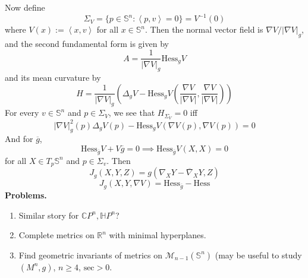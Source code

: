 \bigskip
Now define
$$
\Sigma_V=\{p\in\mathbb{S}^n:\left<p,v\right>=0\}=V^{-1}(0)
$$
where $V(x):=\left<x,v\right>$ for all $x\in\mathbb{S}^n$. Then the normal
vector field is $\nabla V/|\nabla V|_g$, and the second fundamental form is
given by
$$
A=\frac{1}{|\nabla V|_g}\text{Hess}_gV
$$
and its mean curvature by
\begin{equation}
\label{equation-mean-curvature-for-level-sets-V}
H=\frac{1}{|\nabla V|_g}\left(\Delta_gV-\text{Hess}_gV\left(\frac{\nabla
V}{|\nabla V|},\frac{\nabla V}{|\nabla V|}\right)\right)
\end{equation}
For every $v \in \mathbb{S}^n$ and $p\in\Sigma_V$, we see that $H_{\Sigma_V}=0$
iff
$$
|\nabla V|^2_g(p)\Delta_gV(p)-\text{Hess}_gV(\nabla V(p),\nabla V(p))=0
$$
And for $\overline{g}$,
$$
\text{Hess}_{\overline{g}}V+V\overline{g}=0\implies
\text{Hess}_{\overline{g}}V(X,X)=0
$$
for all $X\in T_p\mathbb{S}^n$ and $p\in\Sigma_v$. Then
$$
J_g(X,Y,Z)=g(\nabla_XY-\overline{\nabla}_XY,Z)
$$
$$
J_g(X,Y,\nabla V)=\text{Hess}_{\overline{g}}-\text{Hess}
$$
{\bf Problems.}
\begin{enumerate}
\item Similar story for $\mathbb{C}P^{n},\mathbb{H}P^n$?
\item Complete metrics on $\mathbb{R}^n$ with minimal hyperplanes.
\item Find geometric invariants of metrics on $\mathcal{M}_{n-1}(\mathbb{S}^n)$
(may be useful to study $(M^n,g)$, $n\geq 4$, $\text{sec}>0$.
\end{enumerate}






